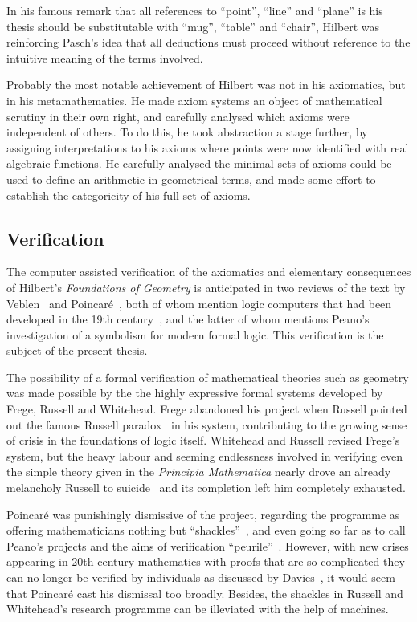 In his famous remark that all references to ``point'', ``line'' and ``plane'' is his thesis should be substitutable with ``mug'', ``table'' and ``chair'', Hilbert was reinforcing Pasch's idea that all deductions must proceed without reference to the intuitive meaning of the terms involved. 

Probably the most notable achievement of Hilbert was not in his axiomatics, but in his metamathematics. He made axiom systems an object of mathematical scrutiny in their own right, and carefully analysed which axioms were independent of others. To do this, he took abstraction a stage further, by assigning interpretations to his axioms where points were now identified with real algebraic functions. He carefully analysed the minimal sets of axioms could be used to define an arithmetic in geometrical terms, and made some effort to establish the categoricity of his full set of axioms.

\subsection{Verification}
The computer assisted verification of the axiomatics and elementary consequences of Hilbert's \emph{Foundations of Geometry} is anticipated in two reviews of the text by Veblen~\cite{VeblenHilbertReview} and Poincar\'{e}~\cite{PoincareReview}, both of whom mention logic computers that had been developed in the 19th century~\cite{LogicMachines}, and the latter of whom mentions Peano's investigation of a symbolism for modern formal logic. This verification is the subject of the present thesis.

The possibility of a formal verification of mathematical theories such as geometry was made possible by the the highly expressive formal systems developed by Frege, Russell and Whitehead. Frege abandoned his project when Russell pointed out the famous Russell paradox~\cite{RussellsParadox} in his system, contributing to the growing sense of crisis in the foundations of logic itself. Whitehead and Russell revised Frege's system, but the heavy labour and seeming endlessness involved in verifying even the simple theory given in the \emph{Principia Mathematica} nearly drove an already melancholy Russell to suicide~\cite{RussellSuicide} and its completion left him completely exhausted.

Poincar\'{e} was punishingly dismissive of the project, regarding the programme as offering mathematicians nothing but ``shackles''~\cite{PoincareShackles}, and even going so far as to call Peano's projects and the aims of verification ``peurile''~\cite{PoincareReview}. However, with new crises appearing in 20th century mathematics with proofs that are so complicated they can no longer be verified by individuals as discussed by Davies~\cite{WhitherMathematics}, it would seem that Poincar\'{e} cast his dismissal too broadly. Besides, the shackles in Russell and Whitehead's research programme can be illeviated with the help of machines.

